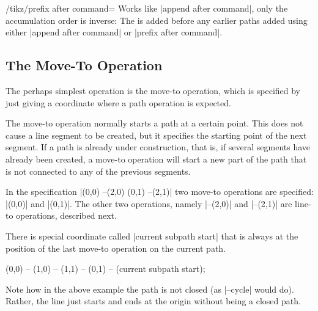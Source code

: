 \begin{key}{/tikz/prefix after command=}
  Works like |append after command|, only the accumulation order is
  inverse: The  is added before any earlier paths added
  using either |append after command| or |prefix after command|.
\end{key}



\subsection{The Move-To Operation}

The perhaps simplest operation is the move-to operation, which is
specified by just giving a coordinate where a path operation is
expected.

\begin{pathoperation}[noindex]{}{}
  The move-to operation normally starts a path at a certain
  point. This does not cause a line segment to be created, but it
  specifies the starting point of the next segment. If a path is
  already under construction, that is, if several segments have
  already been created, a move-to operation will start a new part of the
  path that is not connected to any of the previous segments.

\begin{codeexample}[]
\end{codeexample}

  In the specification |(0,0) --(2,0) (0,1) --(2,1)| two move-to
  operations are specified: |(0,0)| and |(0,1)|. The other two
  operations, namely |--(2,0)| and |--(2,1)| are line-to operations,
  described next.
\end{pathoperation}

There is special coordinate called |current subpath start| that is
always at the position of the last move-to operation on the current
path.

\begin{codeexample}[]
\tikz [line width=2mm]
  \draw (0,0) -- (1,0) -- (1,1)
        -- (0,1) -- (current subpath start);
\end{codeexample}

Note how in the above example the path is not closed (as |--cycle|
would do). Rather, the line just starts and ends at the origin without
being a closed path.


